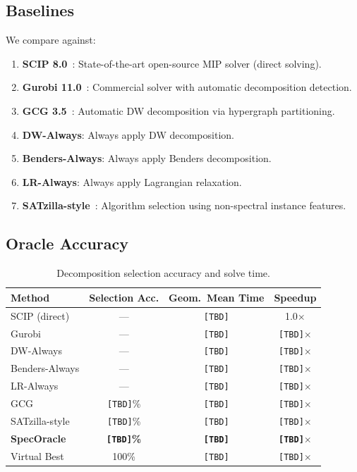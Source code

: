 \documentclass[11pt]{article}
\begin{document}
\subsection{Baselines}

We compare against:
\begin{enumerate}
\item \textbf{SCIP 8.0}~\cite{scip}: State-of-the-art open-source MIP solver (direct solving).
\item \textbf{Gurobi 11.0}~\cite{gurobi}: Commercial solver with automatic decomposition detection.
\item \textbf{GCG 3.5}~\cite{gcg}: Automatic DW decomposition via hypergraph partitioning.
\item \textbf{DW-Always}: Always apply DW decomposition.
\item \textbf{Benders-Always}: Always apply Benders decomposition.
\item \textbf{LR-Always}: Always apply Lagrangian relaxation.
\item \textbf{SATzilla-style}~\cite{xu2008}: Algorithm selection using non-spectral instance features.
\end{enumerate}

\subsection{Oracle Accuracy}

\begin{table}[t]
\centering
\caption{Decomposition selection accuracy and solve time.}
\begin{tabular}{lccc}
\toprule
\textbf{Method} & \textbf{Selection Acc.} & \textbf{Geom.\ Mean Time} & \textbf{Speedup} \\
\midrule
SCIP (direct) & --- & \texttt{[TBD]} & 1.0$\times$ \\
Gurobi & --- & \texttt{[TBD]} & \texttt{[TBD]}$\times$ \\
DW-Always & --- & \texttt{[TBD]} & \texttt{[TBD]}$\times$ \\
Benders-Always & --- & \texttt{[TBD]} & \texttt{[TBD]}$\times$ \\
LR-Always & --- & \texttt{[TBD]} & \texttt{[TBD]}$\times$ \\
GCG & \texttt{[TBD]}\% & \texttt{[TBD]} & \texttt{[TBD]}$\times$ \\
SATzilla-style & \texttt{[TBD]}\% & \texttt{[TBD]} & \texttt{[TBD]}$\times$ \\
\midrule
\textbf{SpecOracle} & \textbf{\texttt{[TBD]}\%} & \textbf{\texttt{[TBD]}} & \textbf{\texttt{[TBD]}$\times$} \\
Virtual Best & 100\% & \texttt{[TBD]} & \texttt{[TBD]}$\times$ \\
\bottomrule
\end{tabular}
\end{table}
\end{document}
